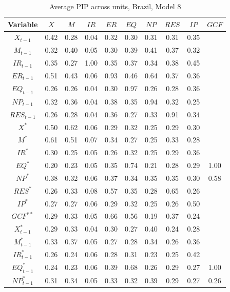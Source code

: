 \documentclass[a4paper, twoside]{templates/ociamthesis}
\begin{document}
\begin{table}[!ht]

\caption{\label{tab:Table55BR8}Average PIP across units, Brazil, Model 8}
\centering
\fontsize{6}{8}\selectfont
\begin{tabular}[t]{cccccccccc}
\toprule
Variable & $X$ & $M$ & $IR$ & $ER$ & $EQ$ & $NP$ & $RES$ & $IP$ & $GCF$\\
\midrule
$X_{t-1}$ & 0.42 & 0.28 & 0.04 & 0.32 & 0.30 & 0.31 & 0.31 & 0.35 & \\
$M_{t-1}$ & 0.32 & 0.40 & 0.05 & 0.30 & 0.39 & 0.41 & 0.37 & 0.32 & \\
$IR_{t-1}$ & 0.35 & 0.27 & 1.00 & 0.35 & 0.37 & 0.34 & 0.38 & 0.45 & \\
$ER_{t-1}$ & 0.51 & 0.43 & 0.06 & 0.93 & 0.46 & 0.64 & 0.37 & 0.36 & \\
$EQ_{t-1}$ & 0.26 & 0.26 & 0.04 & 0.30 & 0.97 & 0.26 & 0.28 & 0.36 & \\
$NP_{t-1}$ & 0.32 & 0.36 & 0.04 & 0.38 & 0.35 & 0.94 & 0.32 & 0.25 & \\
$RES_{t-1}$ & 0.26 & 0.28 & 0.04 & 0.36 & 0.27 & 0.33 & 0.91 & 0.34 & \\
$X^*$ & 0.50 & 0.62 & 0.06 & 0.29 & 0.32 & 0.25 & 0.29 & 0.30 & \\
$M^*$ & 0.61 & 0.51 & 0.07 & 0.34 & 0.27 & 0.25 & 0.33 & 0.28 & \\
$IR^*$ & 0.30 & 0.25 & 0.05 & 0.26 & 0.32 & 0.25 & 0.29 & 0.36 & \\
$EQ^*$ & 0.20 & 0.23 & 0.05 & 0.35 & 0.74 & 0.21 & 0.28 & 0.29 & 1.00\\
$NP^*$ & 0.38 & 0.32 & 0.06 & 0.37 & 0.34 & 0.35 & 0.35 & 0.30 & 0.58\\
$RES^*$ & 0.26 & 0.33 & 0.08 & 0.57 & 0.35 & 0.28 & 0.65 & 0.26 & \\
$IP^*$ & 0.27 & 0.27 & 0.06 & 0.29 & 0.32 & 0.25 & 0.26 & 0.50 & \\
$GCF^{**}$ & 0.29 & 0.33 & 0.05 & 0.66 & 0.56 & 0.19 & 0.37 & 0.24 & \\
$X^*_{t-1}$ & 0.29 & 0.33 & 0.04 & 0.30 & 0.27 & 0.40 & 0.24 & 0.28 & \\
$M^*_{t-1}$ & 0.33 & 0.37 & 0.05 & 0.27 & 0.28 & 0.34 & 0.26 & 0.36 & \\
$IR^*_{t-1}$ & 0.26 & 0.24 & 0.06 & 0.28 & 0.31 & 0.23 & 0.25 & 0.42 & \\
$EQ^*_{t-1}$ & 0.24 & 0.23 & 0.06 & 0.39 & 0.68 & 0.26 & 0.29 & 0.27 & 1.00\\
$NP^*_{t-1}$ & 0.31 & 0.34 & 0.05 & 0.33 & 0.32 & 0.39 & 0.29 & 0.27 & 0.26\\

\end{tabular}
\end{table}
\end{document}
